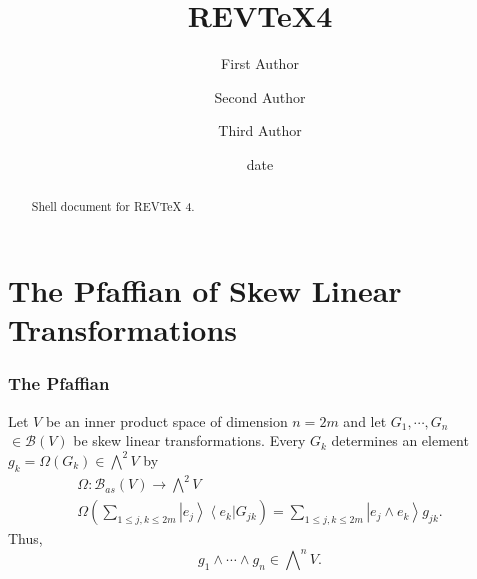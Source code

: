 \documentclass[aps,preprint]{revtex4}%
\begin{document}
\title[Short title for running header]{REV\TeX4}
\author{First Author}
\author{Second Author}
\author{Third Author}

\begin{abstract}
Shell document for REV\TeX{} 4.

\end{abstract}
\date[Date text]{date}




\maketitle
\tableofcontents


\section{The Pfaffian of Skew Linear Transformations}

\subsubsection{The Pfaffian}

Let $V$ be an inner product space of dimension $n=2m$ and let $G_{1}%
,\cdots,G_{n}$ $\in\mathcal{B}\left(  V\right)  $ be skew linear
transformations. Every $G_{k}$ determines an element $g_{k}=\Omega\left(
G_{k}\right)  \in%
{\textstyle\bigwedge^{2}}
V$ by
\begin{gather}
\Omega:\mathcal{B}_{as}\left(  V\right)  \rightarrow%
{\textstyle\bigwedge\nolimits^{2}}
V\\
\Omega\left(  \sum_{1\leq j,k\leq2m}\left\vert e_{j}\right\rangle \left\langle
e_{k}\right\vert G_{jk}\right)  =\sum_{1\leq j,k\leq2m}\left\vert e_{j}\wedge
e_{k}\right\rangle g_{jk}.
\end{gather}
Thus,
\begin{equation}
g_{1}\wedge\cdots\wedge g_{n}\in%
{\textstyle\bigwedge\nolimits^{n}}
V.
\end{equation}
\end{document}
